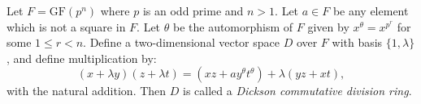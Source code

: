Let $F = \mathrm{GF}(p^n)$ where $p$ is an odd prime and $n > 1$. Let $a \in F$ be any element which is not a square in $F$. Let $\theta$ be the automorphism of $F$ given by $x^\theta = x^{p^r}$ for some $1 \leq r < n$. Define a two-dimensional vector space $D$ over $F$ with basis $\{1, \lambda\}$, and define multiplication by:
$$
(x + \lambda y)(z + \lambda t) = (xz + a y^\theta t^\theta) + \lambda(yz + xt),
$$
with the natural addition. Then $D$ is called a \emph{Dickson commutative division ring}.